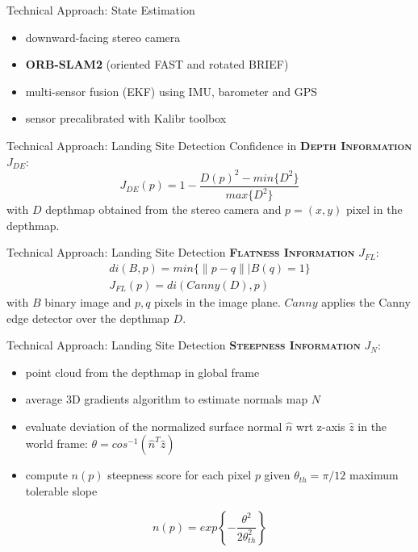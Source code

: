 \documentclass[10pt]{beamer}
\begin{document}
    \begin{frame}{Technical Approach: State Estimation}
        \justifying
        \begin{itemize}
            \item downward-facing stereo camera
            \item \textbf{ORB-SLAM2} (oriented FAST and rotated BRIEF)
            \item multi-sensor fusion (EKF) using IMU, barometer and GPS
            \item sensor precalibrated with Kalibr toolbox
        \end{itemize}
    \end{frame}

    \begin{frame}{Technical Approach: Landing Site Detection}
        \justifying
        Confidence in \textbf{\textsc{Depth Information}} $J_{DE}$:
        \begin{equation*}
            J_{DE}(p) = 1 - \frac{D(p)^2 - min\{D^2\}}{max\{D^2\}}
        \end{equation*}
        with $D$ depthmap obtained from the stereo camera and $p=(x,y)$
        pixel in the depthmap.
    \end{frame}

    \begin{frame}{Technical Approach: Landing Site Detection}
        \justifying
        \textbf{\textsc{Flatness Information}} $J_{FL}$:
        \begin{gather*}
            di(B, p) = min\Big\{\|p-q\| \Big| B(q)=1\Big\} \\
            J_{FL}(p) = di(Canny(D), p)
        \end{gather*}
        with $B$ binary image and $p, q$ pixels in the image plane. $Canny$
        applies the Canny edge detector over the depthmap $D$.
    \end{frame}

    \begin{frame}{Technical Approach: Landing Site Detection}
        \justifying
        \textbf{\textsc{Steepness Information}} $J_{N}$:
        \begin{itemize}
            \item point cloud from the depthmap in global frame
            \item average 3D gradients algorithm to estimate normals map $N$
            \item evaluate deviation of the normalized surface normal
                $\hat{n}$ wrt z-axis $\hat{z}$ in the world frame:
                $\theta = cos^{-1}(\hat{n}^T\hat{z})$
            \item compute $n(p)$ steepness score for each pixel $p$ given
                $\theta_{th}=\pi/12$ maximum tolerable slope
        \end{itemize}
        \begin{equation*}
            n(p) = exp\left\{ -\frac{\theta^2}{2\theta^2_{th}} \right\}
        \end{equation*}
    \end{frame}
\end{document}
